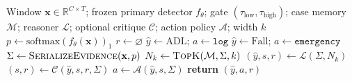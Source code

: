 \begin{algorithm}[!t]
\caption{RCDP inference for one inertial window}
\label{alg:rcdp}
\begin{algorithmic}[1]
\REQUIRE Window $\mathbf{x}\in\mathbb{R}^{C\times T}$; frozen primary detector $f_\theta$; gate $(\tau_{\mathrm{low}},\tau_{\mathrm{high}})$; case memory $\mathcal{M}$; reasoner $\mathcal{L}$; optional critique $\mathcal{C}$; action policy $\mathcal{A}$; width $k$
\STATE $p\leftarrow \mathrm{softmax}(f_\theta(\mathbf{x}))_1$ 
\STATE $r\leftarrow\varnothing$
  \STATE $\hat{y}\leftarrow\mathrm{ADL}$; \; $a\leftarrow\texttt{log}$ 
  \STATE $\hat{y}\leftarrow\mathrm{Fall}$; \; $a\leftarrow\texttt{emergency}$ 
\ELSE
  \STATE $\Sigma\leftarrow\textsc{SerializeEvidence}(\mathbf{x},p)$ 
  \STATE $N_k\leftarrow\textsc{TopK}(\mathcal{M},\Sigma,k)$ 
  \STATE $(\hat{y},s,r)\leftarrow\mathcal{L}(\Sigma,N_k)$ 
  \STATE $(s,r)\leftarrow\mathcal{C}(\hat{y},s,r,\Sigma)$ 
  \STATE $a\leftarrow\mathcal{A}(\hat{y},s,\Sigma)$ 
\ENDIF
\STATE \textbf{return} $(\hat{y},a,r)$ 
\end{algorithmic}
\end{algorithm}
